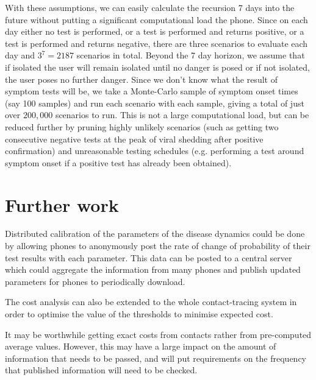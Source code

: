 \documentclass{article}
\begin{document}
With these assumptions, we can easily calculate the recursion 7 days into the future without putting a significant computational load the phone. Since on each day either no test is performed, or a test is performed and returns positive, or a test is performed and returns negative, there are three scenarios to evaluate each day and $3^7 = 2187$ scenarios in total. Beyond the 7 day horizon, we assume that if isolated the user will remain isolated until no danger is posed or if not isolated, the user poses no further danger. Since we don't know what the result of symptom tests will be, we take a Monte-Carlo sample of symptom onset times (say 100 samples) and run each scenario with each sample, giving a total of just over $200,000$ scenarios to run. This is not a large computational load, but can be reduced further by pruning highly unlikely scenarios (such as getting two consecutive negative tests at the peak of viral shedding after positive confirmation) and unreasonable testing schedules (e.g. performing a test around symptom onset if a positive test has already been obtained).

\section{Further work}

Distributed calibration of the parameters of the disease dynamics could be done by allowing phones to anonymously post the rate of change of probability of their test results with each parameter. This data can be posted to a central server which could aggregate the information from many phones and publish updated parameters for phones to periodically download. 

The cost analysis can also be extended to the whole contact-tracing system in order to optimise the value of the thresholds to minimise expected cost.

It may be worthwhile getting exact costs from contacts rather from pre-computed average values. However, this may have a large impact on the amount of information that needs to be passed, and will put requirements on the frequency that published information will need to be checked.

%

%
%
% 
%

\end{document}
